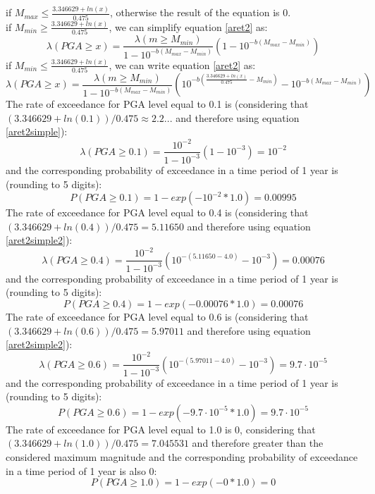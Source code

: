 if $M_{max} \leq  \frac{3.346629 + ln(x)}{0.475}$, otherwise the result of the equation is 0.\\
if $M_{min} \geq  \frac{3.346629 + ln(x)}{0.475}$, we can simplify equation \ref{aret2} as:
\begin{equation}
\label{aret2simple}
\lambda(PGA \geq x) =  \frac{\lambda(m\geq M_{min})}{1 - 10^{-b(M_{max} - M_{min})}} (1 - 10^{-b(M_{max} - M_{min})})
\end{equation}
if $M_{min} \leq  \frac{3.346629 + ln(x)}{0.475}$, we can write equation \ref{aret2} as:
\begin{equation}
\label{aret2simple2}
\lambda(PGA \geq x) =  \frac{\lambda(m\geq M_{min})}{1 - 10^{-b(M_{max} - M_{min})}} (10^{-b( \frac{3.346629 + ln(x)}{0.475} - M_{min})} - 10^{-b(M_{max} - M_{min})})
\end{equation}
The rate of exceedance for PGA level equal to 0.1 is (considering that $(3.346629 +ln(0.1)) / 0.475 \approx 2.2...$ and therefore using equation \ref{aret2simple}):
\begin{equation}
\lambda(PGA \geq 0.1) =  \frac{10^{-2}}{1 - 10^{-3}} (1 - 10^{-3}) = 10^{-2}
\end{equation}
and the corresponding probability of exceedance in a time period of 1 year is (rounding to 5 digits):
\begin{equation}
P(PGA \geq 0.1) = 1 - exp(- 10^{-2} * 1.0) = 0.00995
\end{equation}
The rate of exceedance for PGA level equal to 0.4 is (considering that  $(3.346629 +ln(0.4)) / 0.475 = 5.11650$ and therefore using equation \ref{aret2simple2}):
\begin{equation}
\lambda(PGA \geq 0.4) =  \frac{10^{-2}}{1 - 10^{-3}} (10^{-(5.11650 - 4.0)} - 10^{-3}) = 0.00076
\end{equation}
and the corresponding probability of exceedance in a time period of 1 year is (rounding to 5 digits):
\begin{equation}
P(PGA \geq 0.4) = 1 - exp(- 0.00076 * 1.0) = 0.00076
\end{equation}
The rate of exceedance for PGA level equal to 0.6 is (considering that  $(3.346629 +ln(0.6)) / 0.475 = 5.97011$ and therefore using equation \ref{aret2simple2}):
\begin{equation}
\lambda(PGA \geq 0.6) =  \frac{10^{-2}}{1 - 10^{-3}} (10^{-(5.97011 - 4.0)} - 10^{-3}) = 9.7 \cdot 10^{-5}
\end{equation}
and the corresponding probability of exceedance in a time period of 1 year is (rounding to 5 digits):
\begin{equation}
P(PGA \geq 0.6) = 1 - exp(- 9.7 \cdot 10^{-5} * 1.0) = 9.7 \cdot 10^{-5}
\end{equation}
The rate of exceedance for PGA level equal to 1.0 is 0, considering that  
$(3.346629 +ln(1.0)) / 0.475 = 7.045531$ and therefore greater than the 
considered maximum magnitude and the corresponding probability of 
exceedance in a time period of 1 year is also 0:
\begin{equation}
P(PGA \geq 1.0) = 1 - exp(- 0 * 1.0) = 0
\end{equation}
%
\clearpage
%
